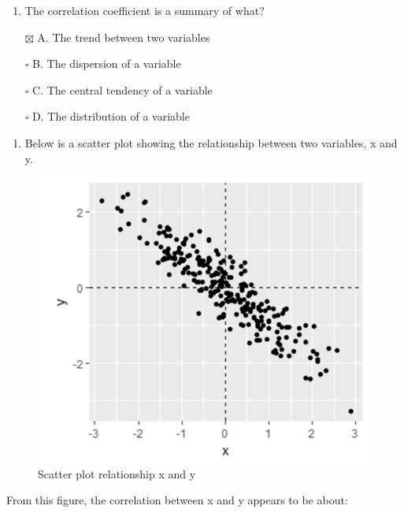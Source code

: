 \documentclass[
]{article}
\providecommand{\tightlist}{%
  \setlength{\itemsep}{0pt}\setlength{\parskip}{0pt}}
\begin{document}
\begin{enumerate}
\def\labelenumi{\arabic{enumi}.}
\setcounter{enumi}{1}
\tightlist
\item
  The correlation coefficient is a summary of what?
\end{enumerate}

\begin{itemize}
\tightlist
\item[$\boxtimes$]
  A. The trend between two variables
\item[$\square$]
  B. The dispersion of a variable
\item[$\square$]
  C. The central tendency of a variable
\item[$\square$]
  D. The distribution of a variable
\end{itemize}

\begin{enumerate}
\def\labelenumi{\arabic{enumi}.}
\setcounter{enumi}{2}
\tightlist
\item
  Below is a scatter plot showing the relationship between two
  variables, x and y.
\end{enumerate}

\begin{figure}
\centering
\includegraphics{images/scatterplot_x_y.png}
\caption{Scatter plot relationship x and y}
\end{figure}

From this figure, the correlation between x and y appears to be about:
\end{document}
